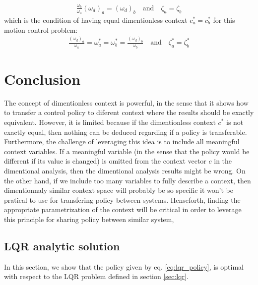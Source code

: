 \begin{align}
\frac{\omega_b}{\omega_a} (\omega_d )_a = (\omega_d )_b 
\quad \text{and}  \quad \zeta_a = \zeta_b
\end{align}
which is the condition of having equal dimentionless context $c_a^* = c_b^*$ for this motion control problem:
\begin{align}
\frac{(\omega_d )_a}{\omega_a}  = \omega^*_a =  \omega^*_b = \frac{(\omega_d )_b}{\omega_b} 
\quad \text{and}  \quad \zeta_a^* = \zeta_b^*
\end{align}




\section{Conclusion}


The concept of dimentionless context is powerful, in the sense that it shows how to transfer a control policy to diferent context where the results should be exactly equivalent. However, it is limited because if the dimentionless context $c^*$ is not exactly equal, then nothing can be deduced regarding if a policy is transferable. Furthermore, the challenge of leveraging this idea is to include all meaningful context variables. If a meaningful variable (in the sense that the policy would be different if its value is changed) is omitted from the context vector $c$ in the dimentional analysis, then the dimentional analysis results might be wrong. On the other hand, if we include too many variables to fully describe a context, then dimentionnaly similar context space will probably be so specific it won't be pratical to use for transfering policy between systems. Henseforth, finding the appropriate parametrization of the context will be critical in order to leverage this principle for sharing policy between similar system, 

\appendix
\subsection{LQR analytic solution}
\label{sec:lqr_proof}
In this section, we show that the policy given by eq. \eqref{eq:lqr_policy}, is optimal with respect to the LQR problem defined in section \ref{sec:lqr}.



